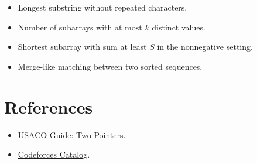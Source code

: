 \begin{itemize}
  \item Longest substring without repeated characters.
  \item Number of subarrays with at most \(k\) distinct values.
  \item Shortest subarray with sum at least \(S\) in the nonnegative setting.
  \item Merge-like matching between two sorted sequences.
\end{itemize}

\section*{References}

\begin{itemize}
  \item \href{https://usaco.guide/silver/two-pointers}{USACO Guide: Two Pointers}.
  \item \href{https://codeforces.com/catalog}{Codeforces Catalog}.
\end{itemize}
